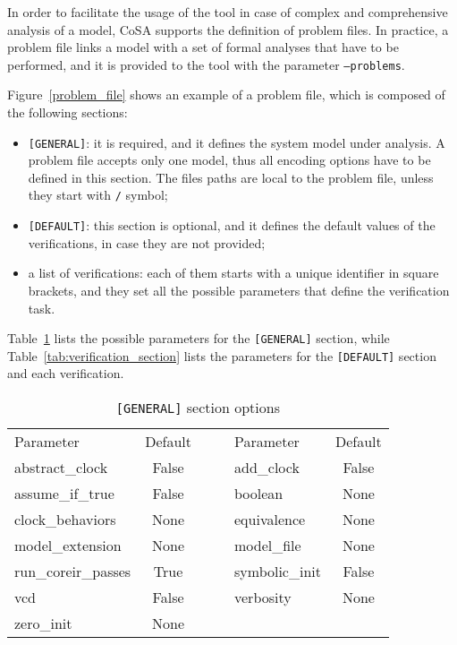\documentclass{article}
\theoremstyle{definition}
\begin{document}
In order to facilitate the usage of the tool in case of complex and
comprehensive analysis of a model, CoSA supports the definition of
problem files. In practice, a problem file links a model with a set of
formal analyses that have to be performed, and it is provided to the
tool with the parameter \texttt{--problems}.

Figure~\ref{problem_file} shows an example of a problem file, which is
composed of the following sections:
\begin{itemize}
\item \texttt{[GENERAL]}: it is required, and it defines the system
  model under analysis. A problem file accepts only one model, thus
  all encoding options have to be defined in this section. The files
  paths are local to the problem file, unless they start with
  \texttt{/} symbol;
\item \texttt{[DEFAULT]}: this section is optional, and it defines the
  default values of the verifications, in case they are not provided;
\item a list of verifications: each of them starts with a unique
  identifier in square brackets, and they set all the possible
  parameters that define the verification task.
\end{itemize}

Table~\ref{tab:general_section} lists the possible parameters for the
\texttt{[GENERAL]} section, while Table~\ref{tab:verification_section}
lists the parameters for the \texttt{[DEFAULT]} section and each
verification.

\begin{table}[h]
  \centering
\begin{tabular}{ l c c l c }
  Parameter & Default & & Parameter & Default \\ \cline{1-2} \cline{4-5}
abstract\_clock & False & ~~ & add\_clock & False \\
assume\_if\_true & False & ~~ & boolean & None \\
clock\_behaviors & None & ~~ & equivalence & None \\
model\_extension & None & ~~ & model\_file & None \\
run\_coreir\_passes & True & ~~ & symbolic\_init & False \\
vcd & False & ~~ & verbosity & None \\
zero\_init & None
\end{tabular}
\label{tab:general_section}
\caption{\texttt{[GENERAL]} section options}
\end{table}
\end{document}
